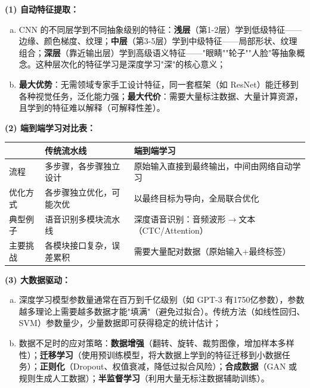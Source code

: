 \documentclass[a4paper,11pt]{ctexart}
\begin{document}
\begin{solutionbox}[参考答案与详细解析]
    \textbf{(1) 自动特征提取：}

    \begin{enumerate}[a.]
        \item CNN 的不同层学到不同抽象级别的特征：\textbf{浅层}（第1-2层）学到低级特征——边缘、颜色梯度、纹理；\textbf{中层}（第3-5层）学到中级特征——局部形状、纹理组合；\textbf{深层}（靠近输出层）学到高级语义特征——"眼睛""轮子""人脸"等抽象概念。这种层次化的特征学习是深度学习"深"的核心意义；
        \item \textbf{最大优势}：无需领域专家手工设计特征，同一套框架（如 ResNet）能迁移到各种视觉任务，泛化能力强；\textbf{最大代价}：需要大量标注数据、大量计算资源，且学到的特征难以解释（可解释性差）。
    \end{enumerate}

    \textbf{(2) 端到端学习对比表：}

    \begin{center}
    \begin{tabular}{p{3.0cm} p{4.0cm} p{4.0cm}}
        \toprule
        & 传统流水线 & 端到端学习 \\
        \midrule
        流程 & 多步骤，各步骤独立设计 & 原始输入直接到最终输出，中间由网络自动学习 \\[0.8em]
        优化方式 & 各步骤独立优化，可能次优 & 以最终目标为导向，全局联合优化 \\[0.8em]
        典型例子 & 语音识别多模块流水线 & 深度语音识别：音频波形$\to$文本（CTC/Attention） \\[0.8em]
        主要挑战 & 各模块接口复杂，误差累积 & 需要大量配对数据（原始输入+最终标签） \\
        \bottomrule
    \end{tabular}
    \end{center}

    \textbf{(3) 大数据驱动：}

    \begin{enumerate}[a.]
        \item 深度学习模型参数量通常在百万到千亿级别（如 GPT-3 有1750亿参数），参数越多理论上需要越多数据才能"填满"（避免过拟合）。传统方法（如线性回归、SVM）参数量少，少量数据即可获得稳定的统计估计；
        \item 数据不足时的应对策略：\textbf{数据增强}（翻转、旋转、裁剪图像，增加样本多样性）；\textbf{迁移学习}（使用预训练模型，将大数据上学到的特征迁移到小数据任务）；\textbf{正则化}（Dropout、权值衰减，降低过拟合风险）；\textbf{合成数据}（GAN 或规则生成人工数据）；\textbf{半监督学习}（利用大量无标注数据辅助训练）。
    \end{enumerate}


\end{solutionbox}
\end{document}
